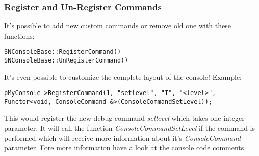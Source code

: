 \subsubsection{Register and Un-Register Commands}
It's possible to add new custom commands or remove old one with these functions:

\begin{lstlisting}[caption=Register and un-register commands]
SNConsoleBase::RegisterCommand()
SNConsoleBase::UnRegisterCommand()
\end{lstlisting}

It's even possible to customize the complete layout of the console! Example:

\begin{lstlisting}[caption=Register command]
pMyConsole->RegisterCommand(1, "setlevel", "I", "<level>", Functor<void, ConsoleCommand &>(ConsoleCommandSetLevel));
\end{lstlisting}

This would register the new debug command \emph{setlevel} which takes one integer parameter. It will call the function \emph{ConsoleCommandSetLevel} if the command is performed which will receive more information about it's \emph{ConsoleCommand} parameter. Fore more information have a look at the console code comments.
